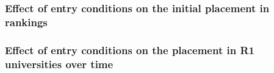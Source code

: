 \documentclass[11pt]{beamer}
\begin{document}
{
	\begin{frame}
		\frametitle{Effect of entry conditions on the initial placement in rankings}
		
	\end{frame}
}


{
	\begin{frame}
		\frametitle{Effect of entry conditions on the placement in R1 universities over time}
		
	\end{frame}
}

%
\end{document}

